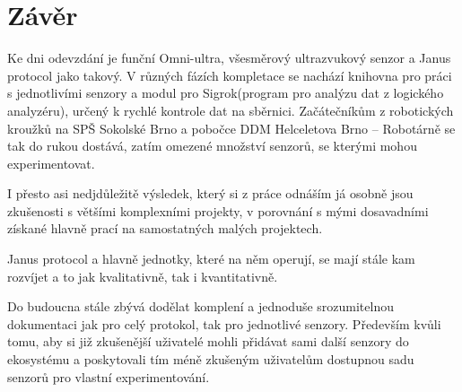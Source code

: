 \newpage
\chapter*{Závěr}

Ke dni odevzdání je funční Omni-ultra, všesměrový ultrazvukový senzor a Janus protocol jako takový.
V různých fázích kompletace se nachází knihovna pro práci s jednotlivími senzory a modul pro Sigrok(program pro analýzu dat z logického analyzéru), určený k rychlé kontrole dat na sběrnici.
Začátečníkům z robotických kroužků na SPŠ Sokolské Brno a pobočce DDM Helceletova Brno -- Robotárně se tak do rukou dostává, zatím omezené množství senzorů, se kterými mohou experimentovat.

I přesto asi nedjdůležitě výsledek, který si z práce odnáším já osobně jsou zkušenosti s většími komplexními projekty, v porovnání s mými dosavadními získané hlavně prací na samostatných malých projektech.

Janus protocol a hlavně jednotky, které na něm operují, se mají stále kam rozvíjet a to jak kvalitativně, tak i kvantitativně.

Do budoucna stále zbývá dodělat komplení a jednoduše srozumitelnou dokumentaci jak pro celý protokol, tak pro jednotlivé senzory.
Především kvůli tomu, aby si již zkušenější uživatelé mohli přidávat sami další senzory do ekosystému a poskytovali tím méně zkušeným uživatelům dostupnou sadu senzorů pro vlastní experimentování. 
